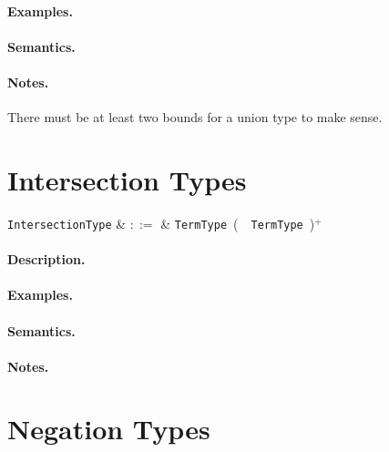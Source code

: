 \paragraph{Examples.}

\paragraph{Semantics.}

\paragraph{Notes.}  There must be at least two bounds for a union type to make sense.


\section{Intersection Types}

\begin{syntax}
  \verb+IntersectionType+ & $::=$ & \verb+TermType+\ \big(\ \token{\&}\ \verb+TermType+\
  \big)$^+$\\
\end{syntax}

\paragraph{Description.}

\paragraph{Examples.}

\paragraph{Semantics.}

\paragraph{Notes.}


\section{Negation Types}

